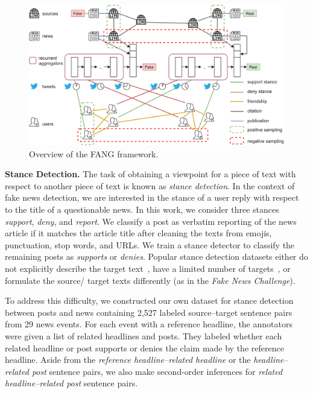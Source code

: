 \documentclass[sigconf,anonymous]{acmart}
\theoremstyle{definition}
\theoremstyle{hypothesis}
\begin{document}
\begin{figure}[tbh]
\centering
\includegraphics[scale=0.235]{fang.png}
\caption{Overview of the FANG framework.}
\label{fig:fang_overview}
\end{figure}


\textbf{Stance Detection.} The task of obtaining a viewpoint for a piece of text with respect to another piece of text is known as \textit{stance detection}. 
In the context of fake news detection, we are interested in the stance of a user reply with respect to the title of a questionable news.
In this work, we consider three stances \textit{support}, \textit{deny}, and \textit{report}. We classify a post as verbatim reporting of the news article if it matches the article title after cleaning the texts from emojis, punctuation, stop words, and URLs.
We train a stance detector to classify the remaining posts as 
\textit{supports} or \textit{denies}.
Popular stance detection datasets either do not explicitly describe the target text~\cite{derczynski-etal-2017-semeval}, have a limited number of targets~\cite{sobhani-etal-2017-dataset,mohammad-etal-2016-semeval}, or formulate the source/ target texts differently (as in the \emph{Fake News Challenge}).

To address this difficulty, we constructed our own dataset for stance detection between posts and news containing 2,527 labeled source--target sentence pairs from 29 news events. For each event with a reference headline, the annotators were given a list of related headlines and posts. They labeled whether each related headline or post supports or denies the claim made by the reference headline. Aside from the \emph{reference headline--related headline} or the \emph{headline--related post} sentence pairs, we also make second-order inferences for \emph{related headline--related post} sentence pairs. 
\end{document}
